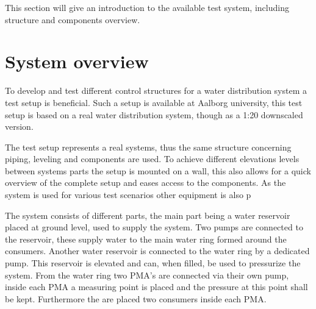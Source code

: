 This section will give an introduction to the available test system, including structure and components overview.  

\section{System overview}
To develop and test different control structures for a water distribution system a test setup is beneficial.
Such a setup is available at Aalborg university, this test setup is based on a real water distribution system, though as a 1:20 downscaled version.

The test setup represents a real systems, thus the same structure concerning piping, leveling and components are used. To achieve different elevations levels between systems parts the setup is mounted on a wall, this also allows for a quick overview of the complete setup and eases access to the components. As the system is used for various test scenarios other equipment is also p

The system consists of different parts, the main part being a water reservoir placed at ground level, used to supply the system. Two pumps are connected to the reservoir, these supply water to the main water ring formed around the consumers. 
Another water reservoir is connected to the water ring by a dedicated pump. This reservoir is elevated and can, when filled, be used to pressurize the system. 
From the water ring two PMA's are connected via their own pump, inside each PMA a measuring point is placed and the pressure at this point shall be kept. Furthermore the are placed two consumers inside each PMA.         

